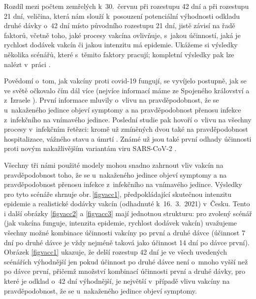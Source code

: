
Rozdíl mezi počtem zemřelých k~30.\ červnu při rozestupu 42 dní a při rozestupu 21 dní, veličina, která nám slouží k~posouzení potenciální výhodnosti odkladu druhé dávky o~42 dní místo původního rozestupu 21 dní, jistě závisí na řadě faktorů, včetně toho, jaké procesy vakcína ovlivňuje, s~jakou účinností, jaká je rychlost dodávek vakcín či jakou intenzitu má epidemie. Ukážeme si výsledky několika scénářů, které s~těmito faktory pracují; kompletní výsledky pak lze nalézt v~práci \cite{vaccpaper}.

Povědomí o~tom, jak vakcíny proti covid-19 fungují, se vyvíjelo postupně, jak se ve světě očkovalo čím dál více (nejvíce informací máme ze Spojeného království \cite{Hall_etal2021,Vasileiou_etal2021} a z~Izraele \cite{Haas_etal2021}). První informace mluvily o~vlivu na pravděpodobnost, že se u~nakaženého jedince objeví symptomy a na pravděpodobnost přenosu infekce z~infekčního na vnímavého jedince. Poslední studie pak hovoří o~vlivu na všechny procesy v~infekčním řetězci: kromě už zmíněných dvou také na pravděpodobnost hospitalizace, vážného stavu a úmrtí \cite{Haas_etal2021}. Známé už jsou také první odhady účinnosti proti novým nakažlivějším variantám viru SARS-CoV-2 \cite[a reference uvnitř]{Shapiro_etal2021,delta}. 

Všechny tři námi použité modely mohou snadno zahrnout vliv vakcín na prav\-dě\-po\-dob\-nost toho, že se u~nakaženého jedince objeví symptomy a na pravděpodobnost přenosu infekce z~infekčního na vnímavého jedince. Výsledky pro tyto scénáře shrnuje obr.\,\ref{figvacc1}, předpokládající skutečnou intenzitu epidemie a realistické dodávky vakcín (odhadnuté k~16.\ 3.\ 2021) v~Česku. Tento i další obrázky \ref{figvacc2} a \ref{figvacc3} mají jednotnou strukturu: pro zvolený scénář (jak vakcína funguje, intenzita epidemie, rychlost dodávek vakcín) uvažujeme všechny možné kombinace účinnosti vakcíny po první a druhé dávce (účinnost 7 dní po druhé dávce je vždy nejméně taková jako účinnost 14 dní po dávce první). Obrázek \ref{figvacc1} ukazuje, že delší rozestup 42 dní je ve všech uvedených scénářích výhodnější jen pokud účinnost po druhé dávce není o~mnoho vyšší než po dávce první, přičemž množství kombinací účinnosti první a druhé dávky, pro které je odklad o~42 dní výhodnější, je největší v~případě vlivu vakcíny na pravděpodobnost, že se u~nakaženého jedince objeví symptomy.

